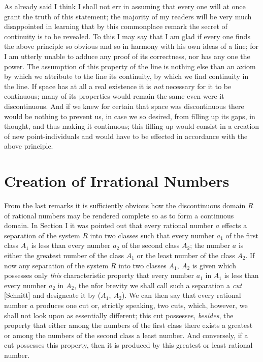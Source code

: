 \documentclass[oneside,12pt]{book}
\begin{document}
As already said I think I shall not err in assuming that every one will at once grant the truth of this statement; the majority of my readers will be very much disappointed in learning that by this commonplace remark the secret of continuity is to be revealed. To this I may say that I am glad if every one finds the above principle so obvious and so in harmony with his own ideas of a line; for I am utterly unable to adduce any proof of its correctness, nor has any one the power. The assumption of this property of the line is nothing else than an axiom by which we attribute to the line its continuity, by which we find continuity in the line. If space has at all a real existence it is \textit{not} necessary for it to be continuous; many of its properties would remain the same even were it discontinuous. And if we knew for certain that space was discontinuous there would be nothing to prevent us, in case we so desired, from filling up its gaps, in thought, and thus making it continuous; this filling up would consist in a creation of new point-individuals and would have to be effected in accordance with the above principle. \par 

\section{Creation of Irrational Numbers}
From the last remarks it is sufficiently obvious how the discontinuous domain $R$ of rational numbers may be rendered complete so as to form a continuous domain. In Section I it was pointed out that every rational number $a$ effects a separation of the system $R$ into two classes such that every number $a_1$ of the first class $A_1$ is less than every number $a_2$ of the second class $A_2$; the number $a$ is either the greatest number of the class $A_1$ or the least number of the class $A_2$. If now any separation of the system $R$ into two classes $A_1,\ A_2$ is given which possesses only \textit{this} characteristic property that every number $a_1$ in $A_1$ is less than every number $a_2$ in $A_2$, the nfor brevity we shall call such a separation a \textit{cut} [Schnitt] and designeate it by ($A_1,\ A_2$). We can then say that every rational number $a$ produces one cut or, strictly speaking, two cuts, which, however, we shall not look upon as essentially different; this cut possesses, \textit{besides}, the property that either among the numbers of the first class there exists a greatest or among the numbers of the second class a least number. And conversely, if a cut possesses this property, then it is produced by this greatest or least rational number. \par 
\end{document}

